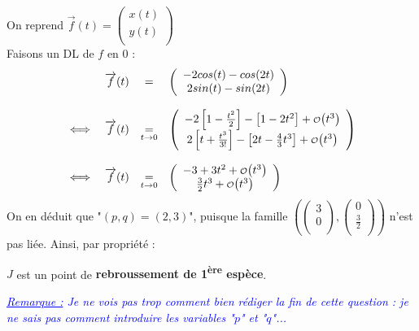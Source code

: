 On reprend $\overrightarrow{f}(t)=
  \left(
  \begin{array}{c}
      x(t) \\
      y(t) \\
    \end{array}
  \right)
$\\
Faisons un DL de $f$ en $0$ :
\[
  \begin{array}{crcl}
                          & \overrightarrow{f}(t)        & = &
    \left(
    \begin{array}{c}
        -2cos(t)-cos(2t) \\
        2sin(t)-sin(2t)  \\
      \end{array}
    \right)                                                    \\\\
    \iff                  &
    \overrightarrow{f}(t) & \underset{t\rightarrow 0}{=} &
    \left(
    \begin{array}{c}
        -2\left[1-\frac{t^2}{2}\right]-\left[1-2t^2\right] + \smallO{t^3}            \\
        2\left[t+\frac{t^3}{3!}\right]-\left[2t-\frac{4}{3}t^3\right] + \smallO{t^3} \\
      \end{array}
    \right)                                                    \\\\
    \iff                  &
    \overrightarrow{f}(t) & \underset{t\rightarrow 0}{=} &
    \left(
    \begin{array}{c}
        -3 + 3t^2 + \smallO{t^3}      \\
        \frac{3}{2}t^3 + \smallO{t^3} \\
      \end{array}
    \right)                                                    \\
  \end{array}
\]
On en déduit que "$(p, q) = (2, 3)$", puisque la famille
$\left(
  \left(
    \begin{array}{c}
        3 \\
        0 \\
      \end{array}
    \right),
  \left(
    \begin{array}{c}
        0           \\
        \frac{3}{2} \\
      \end{array}
    \right)
  \right)
$ n'est pas liée. Ainsi, par propriété :
\begin{result}
  $J$ est un point de \textbf{rebroussement de 1\textsuperscript{ère} espèce}.
\end{result}
\textcolor{Blue}{\textit{\ul{Remarque :} Je ne vois pas trop comment bien rédiger la fin de cette question : je ne sais pas comment introduire les variables "$p$" et "$q$"...}}
